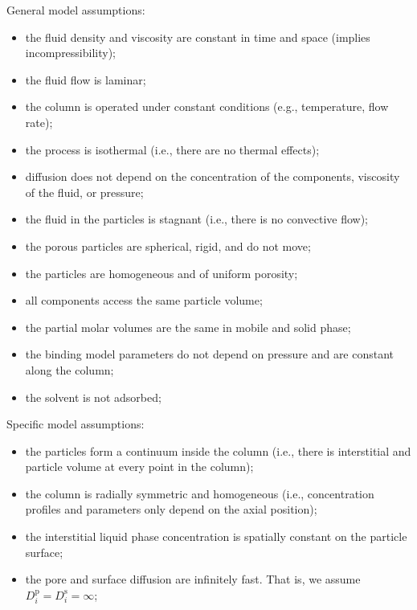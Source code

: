 \documentclass{article}
\begin{document}
General model assumptions:
\begin{itemize}
\item the fluid density and viscosity are constant in time and space (implies incompressibility);
\item the fluid flow is laminar;
\item the column is operated under constant conditions (e.g., temperature, flow rate);
\item the process is isothermal (i.e., there are no thermal effects);
\item diffusion does not depend on the concentration of the components, viscosity of the fluid, or pressure;
\item the fluid in the particles is stagnant (i.e., there is no convective flow);
\item the porous particles are spherical, rigid, and do not move;
\item the particles are homogeneous and of uniform porosity;
\item all components access the same particle volume;
\item the partial molar volumes are the same in mobile and solid phase;
\item the binding model parameters do not depend on pressure and are constant along the column;
\item the solvent is not adsorbed;
\end{itemize}


Specific model assumptions:
\begin{itemize}
\item the particles form a continuum inside the column (i.e., there is interstitial and particle volume at every point in the column);
\item the column is radially symmetric and homogeneous (i.e., concentration profiles and parameters only depend on the axial position);
\item the interstitial liquid phase concentration is spatially constant on the particle surface;
\item the pore and surface diffusion are infinitely fast. That is, we assume $D_{i}^{\mathrm{p}} = D_{i}^{\mathrm{s}} = \infty$;
\end{itemize}
\end{document}
